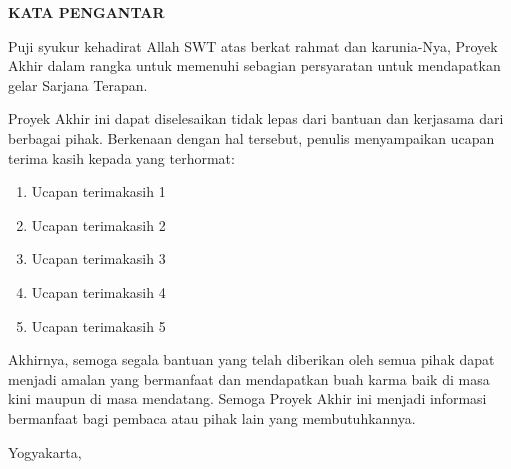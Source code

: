 \clearpage
{}
{}
\begin{center}
    \textbf{\large KATA PENGANTAR}\\[3em]
\end{center}

Puji syukur kehadirat Allah SWT atas berkat rahmat dan karunia-Nya, Proyek Akhir dalam rangka untuk memenuhi sebagian persyaratan untuk mendapatkan gelar Sarjana Terapan.

Proyek Akhir ini dapat diselesaikan tidak lepas dari bantuan dan kerjasama dari berbagai pihak. Berkenaan dengan hal tersebut, penulis menyampaikan ucapan terima kasih kepada yang terhormat:

\begin{enumerate}
    \item Ucapan terimakasih 1
    \item Ucapan terimakasih 2
    \item Ucapan terimakasih 3
    \item Ucapan terimakasih 4
    \item Ucapan terimakasih 5
\end{enumerate}

Akhirnya, semoga segala bantuan yang telah diberikan oleh semua pihak dapat menjadi amalan yang bermanfaat dan mendapatkan buah karma baik di masa kini maupun di masa mendatang. Semoga Proyek Akhir ini menjadi informasi bermanfaat bagi pembaca atau pihak lain yang membutuhkannya.

\begin{flushright}
    Yogyakarta, \tglpengesahan\\[1.25cm]
    \penulis \\
    \nim
\end{flushright}